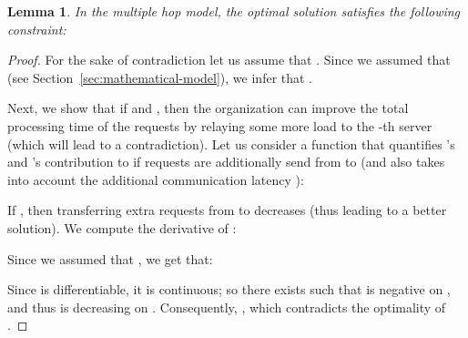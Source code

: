 \documentclass[11pt]{article}
\newtheorem{lemma}[theorem]{Lemma}
\begin{document}
\begin{lemma}\label{lemma:linProg2}
In the multiple hop model, the optimal solution  satisfies the following constraint:

\end{lemma}
\begin{proof}
For the sake of contradiction let us assume that . Since we assumed that  (see Section~\ref{sec:mathematical-model}), we infer that .

Next, we show that if  and , then the organization  can improve the total processing time of the requests  by relaying some more load to the -th server (which will lead to a contradiction).
Let us consider a function  that quantifies 's and 's contribution to  if  requests are additionally send from  to  (and also takes into account the additional communication latency ):

If , then transferring extra  requests from  to  decreases  (thus leading to a better solution). We compute the derivative of :

Since we assumed that , we get that:

Since  is differentiable, it is continuous; so there exists  such that  is negative on , and thus  is decreasing on . Consequently, , which contradicts the optimality of .
\end{proof}
\end{document}
